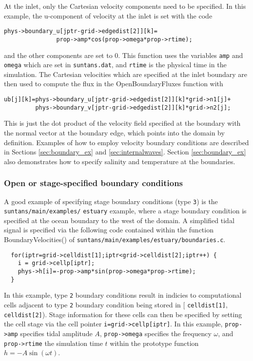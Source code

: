 At the inlet, only the Cartesian velocity components need to be specified.  In this example,
the u-component of velocity at the inlet is set with the code
\begin{verbatim}
phys->boundary_u[jptr-grid->edgedist[2]][k]=
               prop->amp*cos(prop->omega*prop->rtime);
\end{verbatim}
and the other components are set to 0.  This function uses the variables \verb+amp+ and \verb+omega+
which are set in \verb+suntans.dat+, and \verb+rtime+ is the physical time in the simulation.
The Cartesian velocities which are specified at the inlet boundary are then used to compute
the flux in the OpenBoundaryFluxes function with
\begin{verbatim}
ub[j][k]=phys->boundary_u[jptr-grid->edgedist[2]][k]*grid->n1[j]+
         phys->boundary_v[jptr-grid->edgedist[2]][k]*grid->n2[j];
\end{verbatim}
This is just the dot product of the velocity field specified at the boundary with the
normal vector at the boundary edge, which points into the domain by definition.
Examples of how to employ velocity boundary conditions are described in Sections \ref{sec:boundary_ex}
and \ref{sec:internalwaves}.  Section \ref{sec:boundary_ex} also demonstrates 
how to specify salinity and temperature at the boundaries.

\subsubsection{Open or stage-specified boundary conditions}

A good example of specifying stage boundary conditions (type \verb+3+) is the 
\verb+suntans/main/examples/+ \verb+estuary+ example,
where a stage boundary condition is specified at the ocean boundary to the west of the domain.
A simplified tidal signal is specified via the following code contained within the function 
BoundaryVelocities() of \verb+suntans/main/examples/estuary/boundaries.c+.

\begin{verbatim}
  for(iptr=grid->celldist[1];iptr<grid->celldist[2];iptr++) {
    i = grid->cellp[iptr];
    phys->h[i]=-prop->amp*sin(prop->omega*prop->rtime);
  }
\end{verbatim}

In this example, type \verb+2+ boundary conditions result in indicies to computational cells adjacent
to type \verb+2+ boundary condition being stored in [ \verb+celldist[1]+, \verb+celldist[2]+).  
Stage information for these cells can then be specified by setting the cell stage via the cell pointer
\verb+i=grid->cellp[iptr]+.  In this example, \verb+prop->amp+ specifies tidal amplitude $A$, 
\verb+prop->omega+ specifies the frequency $\omega$, and \verb+prop->rtime+ the simulation time $t$ within
the prototype function $h = -A\sin\left(\omega t\right)$.

